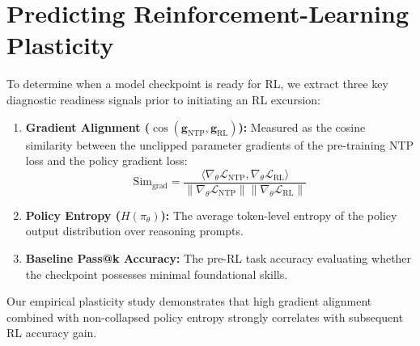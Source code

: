 \section{Predicting Reinforcement-Learning Plasticity}
\label{sec:predicting_plasticity}

To determine when a model checkpoint is ready for RL, we extract three key diagnostic readiness signals prior to initiating an RL excursion:
\begin{enumerate}
    \item \textbf{Gradient Alignment ($\cos(\mathbf{g}_{\text{NTP}}, \mathbf{g}_{\text{RL}})$):} Measured as the cosine similarity between the unclipped parameter gradients of the pre-training NTP loss and the policy gradient loss:
    \begin{equation}
        \text{Sim}_{\text{grad}} = \frac{\langle \nabla_\theta \mathcal{L}_{\text{NTP}}, \nabla_\theta \mathcal{L}_{\text{RL}} \rangle}{\|\nabla_\theta \mathcal{L}_{\text{NTP}}\| \|\nabla_\theta \mathcal{L}_{\text{RL}}\|}
    \end{equation}
    \item \textbf{Policy Entropy ($H(\pi_\theta)$):} The average token-level entropy of the policy output distribution over reasoning prompts.
    \item \textbf{Baseline Pass@k Accuracy:} The pre-RL task accuracy evaluating whether the checkpoint possesses minimal foundational skills.
\end{enumerate}

Our empirical plasticity study demonstrates that high gradient alignment combined with non-collapsed policy entropy strongly correlates with subsequent RL accuracy gain.
